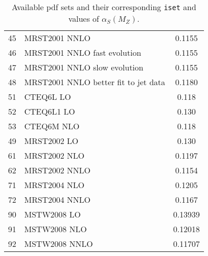 \documentclass[12pt]{article}
\begin{document}
\begin{table}[h]
\begin{center}
\begin{tabular}{|c|l|c|}
45 & MRST2001 NNLO & 0.1155\\
46 & MRST2001 NNLO fast evolution & 0.1155\\
47 & MRST2001 NNLO slow evolution & 0.1155\\
48 & MRST2001 NNLO better fit to jet data & 0.1180\\
\hline
51 & CTEQ6L LO &  0.118         \\
52 & CTEQ6L1 LO &  0.130        \\
53 & CTEQ6M NLO &  0.118       \\
\hline
49 & MRST2002 LO & 0.130        \\
61 & MRST2002 NLO & 0.1197       \\
62 &MRST2002 NNLO & 0.1154       \\
\hline
71 & MRST2004 NLO & 0.1205       \\
72 & MRST2004 NNLO & 0.1167       \\
\hline
90 & MSTW2008 LO & 0.13939       \\
91 & MSTW2008 NLO & 0.12018      \\
92 & MSTW2008 NNLO & 0.11707  \\
\hline
\end{tabular}
\end{center}
\caption{Available pdf sets and their corresponding {\tt iset} and values of
$\alpha_S(M_Z)$.}
\label{pdlabel}
\end{table}
\end{document}
